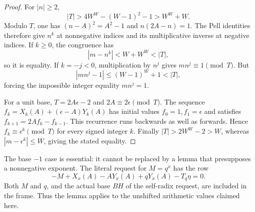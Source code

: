 \begin{proof}
For \(|n|\ge2\),
\[
 |T|>4W^W-(W-1)^2-1>W^W+W.
\]
Modulo \(T\), one has
\((n-A)^2=A^2-1\) and \(n(2A-n)=1\).
The Pell identities therefore give \(n^k\) at nonnegative indices
and its multiplicative inverse at negative indices. If \(k\ge0\),
the congruence has
\[
 |m-n^k|<W+W^W<|T|,
\]
so it is equality. If \(k=-j<0\), multiplication by \(n^j\) gives
\(mn^j\equiv1\pmod T\). But
\[
 |mn^j-1|\le(W-1)^W+1<|T|,
\]
forcing the impossible integer equality \(mn^j=1\).

For a unit base, \(T=2A\epsilon-2\) and \(2A\equiv2\epsilon\pmod T\).
The sequence
\(f_k=X_k(A)+(\epsilon-A)Y_k(A)\) has initial values
\(f_0=1,f_1=\epsilon\) and satisfies
\(f_{k+1}=2Af_k-f_{k-1}\). This recurrence runs backwards as well
as forwards. Hence \(f_k\equiv\epsilon^k\pmod T\) for every signed
integer \(k\). Finally \(|T|>2W^W-2>W\), whereas
\(|m-\epsilon^k|\le W\), giving the stated equality.
\end{proof}

The base \(-1\) case is essential: it cannot be replaced by a lemma
that presupposes a nonnegative exponent. The literal request for
\(M=q^x\) has the row
\[
 -M+X_x(A)-AY_x(A)+qY_x(A)-T_q\eta=0.
\]
Both \(M\) and \(q\), and the actual base \(BH\) of the self-radix
request, are included in the frame. Thus the lemma applies to the
unshifted arithmetic values claimed here.

